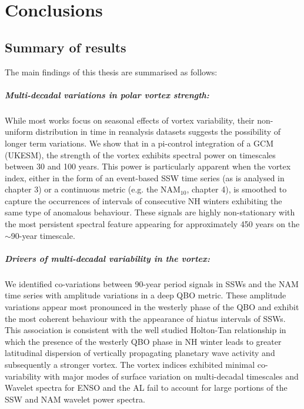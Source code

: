 \chapter{Conclusions}
\label{cha:conclusions}

\section{Summary of results}

The main findings of this thesis are summarised as follows: 

\paragraph{Multi-decadal variations in polar vortex strength:}
While most works focus on seasonal effects of vortex variability, their non-uniform distribution in time in reanalysis datasets suggests the possibility of longer term variations. We show that in a pi-control integration of a GCM (UKESM), the strength of the vortex exhibits spectral power on timescales between 30 and 100 years. This power is particularly apparent when the vortex index, either in the form of an event-based SSW time series (as is analysed in chapter 3) or a continuous metric (e.g. the NAM$_{10}$, chapter 4), is smoothed to capture the occurrences of intervals of consecutive NH winters exhibiting the same type of anomalous behaviour. These signals are highly non-stationary with the most persistent spectral feature appearing for approximately 450 years on the $\sim$90-year timescale. 

\paragraph{Drivers of multi-decadal variability in the vortex:}
We identified co-variations between 90-year period signals in SSWs and the NAM time series with amplitude variations in a deep QBO metric. These amplitude variations appear most pronounced in the westerly phase of the QBO and exhibit the most coherent behaviour with the appearance of hiatus intervals of SSWs. This association is consistent with the well studied Holton-Tan relationship in which the presence of the westerly QBO phase in NH winter leads to greater latitudinal dispersion of vertically propagating planetary wave activity and subsequently a stronger vortex. The vortex indices exhibited minimal co-variability with major modes of surface variation on multi-decadal timescales and Wavelet spectra for ENSO and the AL fail to account for large portions of the SSW and NAM wavelet power spectra.

